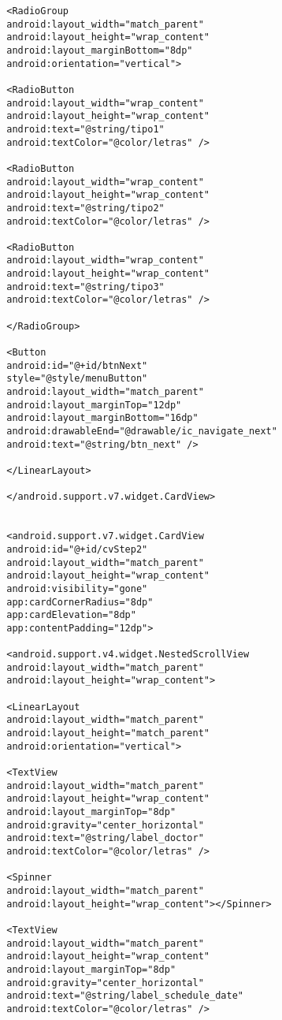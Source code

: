\documentclass[a4paper]{article}
\begin{document}
\begin{lstlisting}
		<RadioGroup
		android:layout_width="match_parent"
		android:layout_height="wrap_content"
		android:layout_marginBottom="8dp"
		android:orientation="vertical">
		
		<RadioButton
		android:layout_width="wrap_content"
		android:layout_height="wrap_content"
		android:text="@string/tipo1"
		android:textColor="@color/letras" />
		
		<RadioButton
		android:layout_width="wrap_content"
		android:layout_height="wrap_content"
		android:text="@string/tipo2"
		android:textColor="@color/letras" />
		
		<RadioButton
		android:layout_width="wrap_content"
		android:layout_height="wrap_content"
		android:text="@string/tipo3"
		android:textColor="@color/letras" />
		
		</RadioGroup>
		
		<Button
		android:id="@+id/btnNext"
		style="@style/menuButton"
		android:layout_width="match_parent"
		android:layout_marginTop="12dp"
		android:layout_marginBottom="16dp"
		android:drawableEnd="@drawable/ic_navigate_next"
		android:text="@string/btn_next" />
		
		</LinearLayout>
		
		</android.support.v7.widget.CardView>
		
		
		<android.support.v7.widget.CardView
		android:id="@+id/cvStep2"
		android:layout_width="match_parent"
		android:layout_height="wrap_content"
		android:visibility="gone"
		app:cardCornerRadius="8dp"
		app:cardElevation="8dp"
		app:contentPadding="12dp">
		
		<android.support.v4.widget.NestedScrollView
		android:layout_width="match_parent"
		android:layout_height="wrap_content">
		
		<LinearLayout
		android:layout_width="match_parent"
		android:layout_height="match_parent"
		android:orientation="vertical">
		
		<TextView
		android:layout_width="match_parent"
		android:layout_height="wrap_content"
		android:layout_marginTop="8dp"
		android:gravity="center_horizontal"
		android:text="@string/label_doctor"
		android:textColor="@color/letras" />
		
		<Spinner
		android:layout_width="match_parent"
		android:layout_height="wrap_content"></Spinner>
		
		<TextView
		android:layout_width="match_parent"
		android:layout_height="wrap_content"
		android:layout_marginTop="8dp"
		android:gravity="center_horizontal"
		android:text="@string/label_schedule_date"
		android:textColor="@color/letras" />
		

\end{lstlisting}
\end{document}

